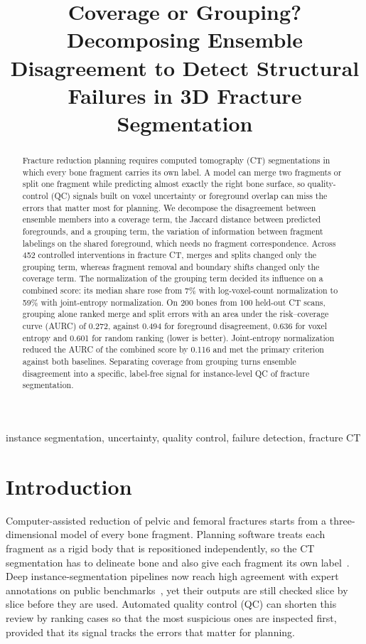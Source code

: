\documentclass[conference]{IEEEtran}
\title{Coverage or Grouping? Decomposing Ensemble Disagreement to Detect Structural Failures in 3D Fracture Segmentation}
\author{\IEEEauthorblockN{Anonymous authors}}
\begin{document}
\maketitle
\begin{abstract}
Fracture reduction planning requires computed tomography (CT) segmentations in which every bone fragment carries its own label. A model can merge two fragments or split one fragment while predicting almost exactly the right bone surface, so quality-control (QC) signals built on voxel uncertainty or foreground overlap can miss the errors that matter most for planning. We decompose the disagreement between ensemble members into a coverage term, the Jaccard distance between predicted foregrounds, and a grouping term, the variation of information between fragment labelings on the shared foreground, which needs no fragment correspondence. Across 452 controlled interventions in fracture CT, merges and splits changed only the grouping term, whereas fragment removal and boundary shifts changed only the coverage term. The normalization of the grouping term decided its influence on a combined score: its median share rose from 7\% with log-voxel-count normalization to 59\% with joint-entropy normalization. On 200 bones from 100 held-out CT scans, grouping alone ranked merge and split errors with an area under the risk--coverage curve (AURC) of 0.272, against 0.494 for foreground disagreement, 0.636 for voxel entropy and 0.601 for random ranking (lower is better). Joint-entropy normalization reduced the AURC of the combined score by 0.116 and met the primary criterion against both baselines. Separating coverage from grouping turns ensemble disagreement into a specific, label-free signal for instance-level QC of fracture segmentation.
\end{abstract}
\begin{IEEEkeywords}
instance segmentation, uncertainty, quality control, failure detection, fracture CT
\end{IEEEkeywords}

\section{Introduction}
Computer-assisted reduction of pelvic and femoral fractures starts from a three-dimensional model of every bone fragment. Planning software treats each fragment as a rigid body that is repositioned independently, so the CT segmentation has to delineate bone and also give each fragment its own label~\cite{sang2026,pengwin2026}. Deep instance-segmentation pipelines now reach high agreement with expert annotations on public benchmarks~\cite{sang2026}, yet their outputs are still checked slice by slice before they are used. Automated quality control (QC) can shorten this review by ranking cases so that the most suspicious ones are inspected first, provided that its signal tracks the errors that matter for planning.
\end{document}
